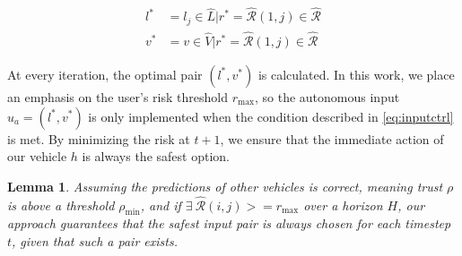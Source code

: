 \documentclass[letterpaper, 10 pt, conference]{ieeeconf}  %
\newtheorem{lemma}{Lemma}
\newcommand\NB[1]{$\spadesuit$\footnote{NB: #1}}
\begin{document}
\begin{align} \label{eq:optpair}
    l^* &=  l_j\in\hat{L}\vert r^* = \hat{\mathcal{R}}(1,j)\in\hat{\mathcal{R}} \nonumber \\
    v^* &=  v\in\hat{V}\vert r^* = \hat{\mathcal{R}}(1,j)\in\hat{\mathcal{R}}
\end{align}


At every iteration, the optimal pair $(l^*,v^*)$ is calculated. In this work, we place an emphasis on the user's risk threshold $r_\max$, so the autonomous input $u_a = (l^*,v^*)$ is only implemented when the condition described in \eqref{eq:inputctrl} is met. By minimizing the risk at $t+1$, we ensure that the immediate action of our vehicle $h$ is always the safest option.

\begin{lemma}
Assuming the predictions of other vehicles is correct, meaning trust $\rho$ is above a threshold $\rho_\min$, and if $\exists~\hat{\mathcal{R}}(i,j) >= r_\max$ over a horizon $H$, our approach guarantees that the safest input pair is always chosen for each timestep $t$, given that such a pair exists.
\end{lemma}
\end{document}
